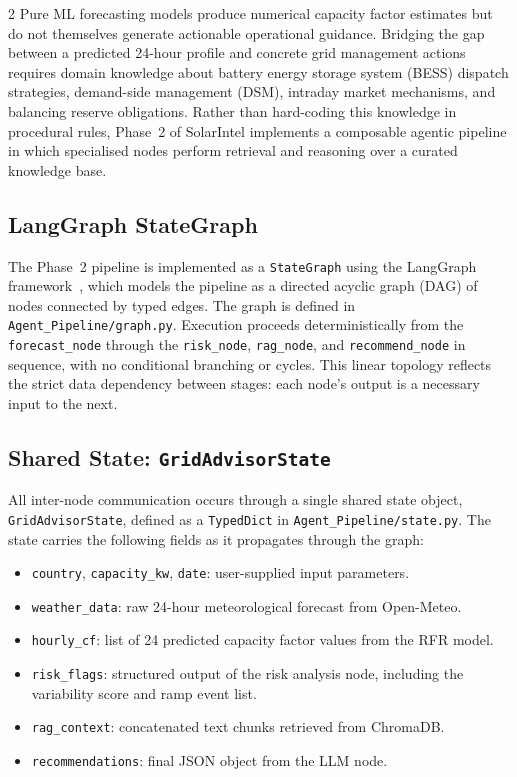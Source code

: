 \documentclass[11pt]{article}
\begin{document}
\begin{multicols}{2}
Pure ML forecasting models produce numerical capacity factor estimates but do
not themselves generate actionable operational guidance. Bridging the gap
between a predicted 24-hour profile and concrete grid management actions
requires domain knowledge about battery energy storage system (BESS) dispatch
strategies, demand-side management (DSM), intraday market mechanisms, and
balancing reserve obligations. Rather than hard-coding this knowledge in
procedural rules, Phase~2 of SolarIntel implements a composable agentic
pipeline in which specialised nodes perform retrieval and reasoning over a
curated knowledge base.

\subsection{LangGraph StateGraph}

The Phase~2 pipeline is implemented as a \texttt{StateGraph} using the
LangGraph framework~\cite{langchain2024}, which models the pipeline as a
directed acyclic graph (DAG) of nodes connected by typed edges. The graph is
defined in \texttt{Agent\_Pipeline/graph.py}. Execution proceeds
deterministically from the \texttt{forecast\_node} through the
\texttt{risk\_node}, \texttt{rag\_node}, and \texttt{recommend\_node} in
sequence, with no conditional branching or cycles. This linear topology
reflects the strict data dependency between stages: each node's output is a
necessary input to the next.

\subsection{Shared State: \texttt{GridAdvisorState}}

All inter-node communication occurs through a single shared state object,
\texttt{GridAdvisorState}, defined as a \texttt{TypedDict} in
\texttt{Agent\_Pipeline/state.py}. The state carries the following fields as
it propagates through the graph:

\begin{itemize}
  \item \texttt{country}, \texttt{capacity\_kw}, \texttt{date}: user-supplied
        input parameters.
  \item \texttt{weather\_data}: raw 24-hour meteorological forecast from
        Open-Meteo.
  \item \texttt{hourly\_cf}: list of 24 predicted capacity factor values from
        the RFR model.
  \item \texttt{risk\_flags}: structured output of the risk analysis node,
        including the variability score and ramp event list.
  \item \texttt{rag\_context}: concatenated text chunks retrieved from
        ChromaDB.
  \item \texttt{recommendations}: final JSON object from the LLM node.
\end{itemize}


\end{multicols}
\end{document}
